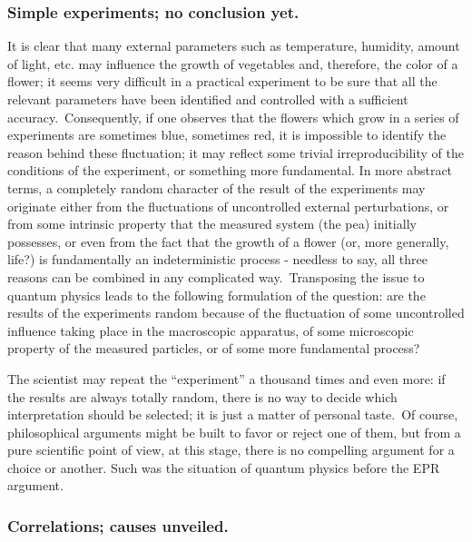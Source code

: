 \documentclass[12pt,onecolumn]{article}%
\begin{document}
\subsubsection{Simple experiments; no conclusion yet.}

It is clear that many external parameters such as temperature, humidity,
amount of light, etc. may influence the growth of vegetables and, therefore,
the color of a flower; it seems very difficult in a practical experiment to be
sure that all the relevant parameters have been identified and controlled with
a sufficient accuracy.\ Consequently, if one observes that the flowers which
grow in a series of experiments are sometimes blue, sometimes red, it is
impossible to identify the reason behind these fluctuation; it may reflect
some trivial irreproducibility of the conditions of the experiment, or
something more fundamental. In more abstract terms, a completely random
character of the result of the experiments may originate either from the
fluctuations of uncontrolled external perturbations, or from some intrinsic
property that the measured system (the pea) initially possesses, or even from
the fact that the growth of a flower (or, more generally, life?) is
fundamentally an indeterministic process - needless to say, all three reasons
can be combined in any complicated way.\ Transposing the issue to quantum
physics leads to the following formulation of the question: are the results of
the experiments random because of the fluctuation of some uncontrolled
influence taking place in the macroscopic apparatus, of some microscopic
property of the measured particles, or of some more fundamental process?

The scientist may repeat the ``experiment'' a thousand times and even more: if
the results are always totally random, there is no way to decide which
interpretation should be selected; it is just a matter of personal taste.\ Of
course, philosophical arguments might be built to favor or reject one of them,
but from a pure scientific point of view, at this stage, there is no
compelling argument for a choice or another. Such was the situation of quantum
physics before the EPR argument.

\subsubsection{Correlations; causes unveiled.}

\label{causes}
\end{document}
